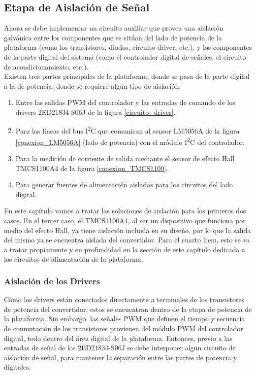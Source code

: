 \subsection{Etapa de Aislación de Señal}

Ahora se debe implementar un circuito auxiliar que provea una aislación galvánica entre los componentes que se sitúan del lado de potencia de la plataforma (como los transistores, diodos, circuito driver, etc.), y los componentes de la parte digital del sistema (como el controlador digital de señales, el circuito de acondicionamiento, etc.).\\

Existen tres partes principales de la plataforma, donde se pasa de la parte digital a la de potencia, donde se requiere algún tipo de aislación:\\

\begin{enumerate}
    \item Entre las salidas PWM del controlador y las entradas de comando de los drivers 2ED21834-S06J de la figura \ref{circuito_driver}.
    \item Para las líneas del bus I\textsuperscript{2}C que comunican al sensor LM5056A de la figura \ref{conexion_LM5056A} (lado de potencia) con el módulo I\textsuperscript{2}C del controlador.
    \item Para la medición de corriente de salida mediante el sensor de efecto Hall TMCS1100A4 de la figura \ref{conexion_TMCS1100}.
    \item Para generar fuentes de alimentación aisladas para los circuitos del lado digital.\\
\end{enumerate}

En este capítulo vamos a tratar las soluciones de aislación para los primeros dos casos. En el tercer caso, el TMCS1100A4, al ser un dispositivo que funciona por medio del efecto Hall, ya tiene aislación incluida en su diseño, por lo que la salida del mismo ya se encuentra aislada del convertidor. Para el cuarto ítem, esto se va a tratar propiamente y en profundidad en la sección de este capítulo dedicada a los circuitos de alimentación de la plataforma.\\

\subsubsection{Aislación de los Drivers}

Cómo los drivers están conectados directamente a terminales de los transistores de potencia del convertidor, estos se encuentran dentro de la etapa de potencia de la plataforma. Sin embargo, las señales PWM que definen el tiempo y secuencia de conmutación de los transistores provienen del módulo PWM del controlador digital, todo dentro del área digital de la plataforma. Entonces, previo a las entradas de señal de los 2ED21834-S06J se debe interponer algun circuito de aislación de señal, para mantener la separación entre las partes de potencia y digitales.\\


